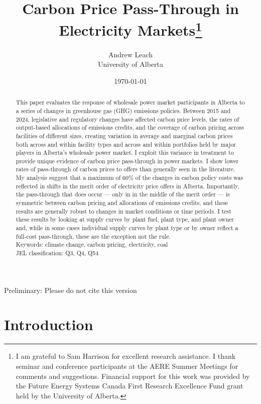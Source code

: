 \documentclass[12pt]{article}
\title{Carbon Price Pass-Through in Electricity Markets\thanks{I am grateful to Sam Harrison for excellent
research assistance. I thank seminar and conference participants at the AERE Summer Meetings for comments and suggestions. Financial support for this work was provided by the Future Energy Systems Canada First Research Excellence Fund grant held by the University of Alberta.}
}
\date{\today}
\author{Andrew Leach\\
 University of Alberta}
\begin{document}
\maketitle

\centering
Preliminary: Please do not cite this version



\begin{abstract}
\noindent This paper evaluates the response of wholesale power market participants in Alberta to a series of changes in greenhouse gas (GHG) emissions policies. Between 2015 and 2024, legislative and regulatory changes have affected carbon price levels, the rates of output-based allocations of emissions credits, and the coverage of carbon pricing across facilities of different sizes, creating variation in average and marginal carbon prices both across and within facility types and across and within portfolios held by major players in Alberta's wholesale power market. I exploit this variance in treatment to provide unique evidence of carbon price pass-through in power markets. I show lower rates of pass-through of carbon prices to offers than generally seen in the literature. My analysis suggest that a maximum of 60\% of the changes in carbon policy costs was reflected in shifts in the merit order of electricity price offers in Alberta. Importantly, the pass-through that does occur --- only in  in the middle of the merit order --- is symmetric between carbon pricing and allocations of emissions credits, and these results are generally robust to changes in market conditions or time periods. I test these results by looking at supply curves by plant fuel, plant type, and plant owner and, while in some cases individual supply curves by plant type or by owner reflect a full-cost pass-through, these are the exception not the rule.\\

\noindent Keywords: climate change, carbon pricing, electricity, coal\\
\noindent JEL classification: Q3, Q4, Q54
\end{abstract}

\thispagestyle{empty}
\newpage
\onehalfspacing


\section{Introduction}
\end{document}
